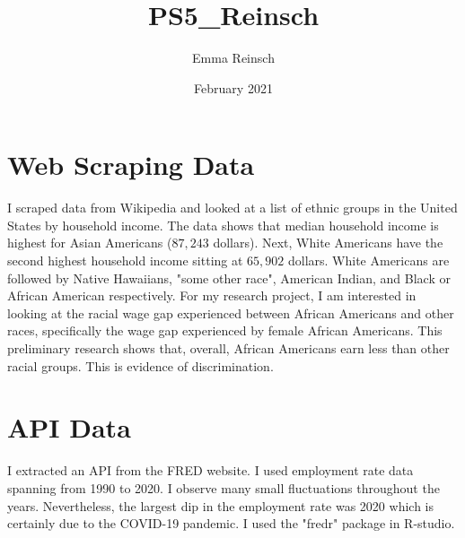 \documentclass{article}
\title{PS5_Reinsch}
\author{Emma Reinsch }
\date{February 2021}
\begin{document}
\maketitle

\section{Web Scraping Data}
I scraped data from Wikipedia and looked at a list of ethnic groups in the United States by household income. The data shows that median household income is highest for Asian Americans ($87,243$ dollars). Next, White Americans have the second highest household income sitting at $65,902$ dollars. White Americans are followed by Native Hawaiians, "some other race", American Indian, and Black or African American respectively.
For my research project, I am interested in looking at the racial wage gap experienced between African Americans and other races, specifically the wage gap experienced by female African Americans. This preliminary research shows that, overall, African Americans earn less than other racial groups. This is evidence of discrimination.

\section{API Data}
I extracted an API from the FRED website. I used employment rate data spanning from 1990 to 2020. I observe many small fluctuations throughout the years. Nevertheless, the largest dip in the employment rate was 2020 which is certainly due to the COVID-19 pandemic. I used the "fredr" package in R-studio.
\end{document}
